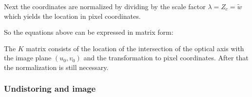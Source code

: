 \documentclass[10pt,a4paper]{scrartcl}
\begin{document}
\begin{multicols*}{2}
\begin{enumerate}
Next the coordinates are normalized by dividing by the scale factor $\lambda = Z_c = \tilde{w}$ which yields the location in pixel coordinates.


So the equations above can be expressed in matrix form:


The $K$ matrix consists of the location of the intersection of the optical axis with the image plane $(u_0,v_0)$ and the transformation to pixel coordinates. After that the normalization is still necessary.
\end{enumerate}

\subsubsection{Undistoring and image}


\end{multicols*}
\end{document}
